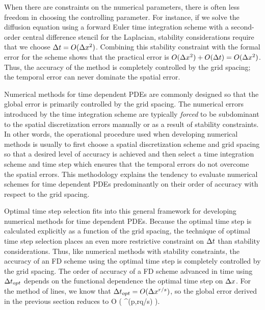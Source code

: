 \documentclass[oneeqnum,onefignum,onetabnum,onethmnum]{siamltex}
\begin{document}
When there are constraints on the numerical parameters, there is often 
less freedom in choosing the controlling parameter.  For instance, if we 
solve the diffusion equation using a forward Euler time integration scheme 
with a second-order central difference stencil for the Laplacian, stability
considerations require that we choose $\Delta t = O(\Delta x^2)$.  
Combining this stability constraint with the formal error for the scheme
shows that the practical error is 
$O(\Delta x^2) + O(\Delta t) = O(\Delta x^2)$.  Thus, the accuracy of the 
method is completely controlled by the grid spacing; the temporal error can 
never dominate the spatial error.

Numerical methods for time dependent PDEs are commonly designed so that 
the global error is primarily controlled by the grid spacing.  The numerical
errors introduced by the time integration scheme are typically \emph{forced}
to be subdominant to the spatial discretization errors manually or as a result
of stability constraints.  In other words, the operational procedure used 
when developing numerical methods is usually to first choose a spatial 
discretization scheme and grid spacing so that a desired level of accuracy 
is achieved and then select a time integration scheme and time step which 
ensures that the temporal errors do not overcome the spatial errors.  
This methodology explains the tendency to evaluate numerical schemes for
time dependent PDEs predominantly on their order of accuracy with respect 
to the grid spacing.

Optimal time step selection fits into this general framework for developing
numerical methods for time dependent PDEs.  Because the optimal time step 
is calculated explicitly as a function of the grid spacing, the technique
of optimal time step selection places an even more restrictive constraint
on $\Delta t$ than stability considerations.  Thus, like numerical
methods with stability constraints, the accuracy of an FD scheme using 
the optimal time step is completely controlled by the grid spacing.  The 
order of accuracy of a FD scheme advanced in time using $\Delta t_{opt}$ 
depends on the functional dependence the optimal time step on $\Delta x$.
For the method of lines, we know that $\Delta t_{opt} = O(\Delta x^{r/s})$, 
so the global error derived in the previous section reduces to 
\beq
O \left( \dx^{\min(p,rq/s)} \right).
\label{eq:global_error_ots_simplified}
\eeq
\end{document}
